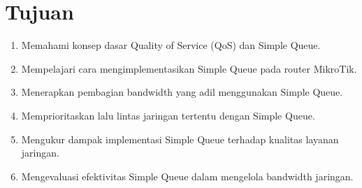 \section*{Tujuan}

\begin{enumerate}
    \item Memahami konsep dasar Quality of Service (QoS) dan Simple Queue.
    \item Mempelajari cara mengimplementasikan Simple Queue pada router MikroTik.
    \item Menerapkan pembagian bandwidth yang adil menggunakan Simple Queue.
    \item Memprioritaskan lalu lintas jaringan tertentu dengan Simple Queue.
    \item Mengukur dampak implementasi Simple Queue terhadap kualitas layanan jaringan.
    \item Mengevaluasi efektivitas Simple Queue dalam mengelola bandwidth jaringan.
\end{enumerate}
